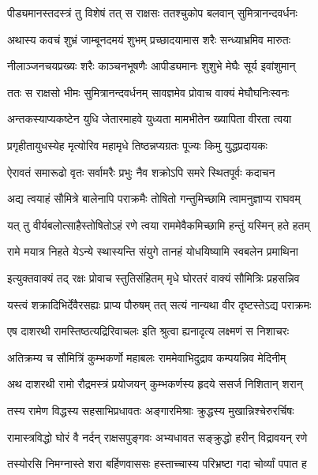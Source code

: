\twolineshloka
{पीड्यमानस्तदस्त्रं तु विशेषं तत् स राक्षसः}
{ततश्चुकोप बलवान् सुमित्रानन्दवर्धनः} %

\twolineshloka
{अथास्य कवचं शुभ्रं जाम्बूनदमयं शुभम्}
{प्रच्छादयामास शरैः सन्ध्याभ्रमिव मारुतः} %

\twolineshloka
{नीलाञ्जनचयप्रख्यः शरैः काञ्चनभूषणैः}
{आपीड्यमानः शुशुभे मेघैः सूर्य इवांशुमान्} %

\twolineshloka
{ततः स राक्षसो भीमः सुमित्रानन्दवर्धनम्}
{सावज्ञमेव प्रोवाच वाक्यं मेघौघनिःस्वनः} %

\twolineshloka
{अन्तकस्याप्यकष्टेन युधि जेतारमाहवे}
{युध्यता मामभीतेन ख्यापिता वीरता त्वया} %

\twolineshloka
{प्रगृहीतायुधस्येह मृत्योरिव महामृधे}
{तिष्ठन्नप्यग्रतः पूज्यः किमु युद्धप्रदायकः} %

\twolineshloka
{ऐरावतं समारूढो वृतः सर्वामरैः प्रभुः}
{नैव शक्रोऽपि समरे स्थितपूर्वः कदाचन} %

\twolineshloka
{अद्य त्वयाहं सौमित्रे बालेनापि पराक्रमैः}
{तोषितो गन्तुमिच्छामि त्वामनुज्ञाप्य राघवम्} %

\twolineshloka
{यत् तु वीर्यबलोत्साहैस्तोषितोऽहं रणे त्वया}
{राममेवैकमिच्छामि हन्तुं यस्मिन् हते हतम्} %

\twolineshloka
{रामे मयात्र निहते येऽन्ये स्थास्यन्ति संयुगे}
{तानहं योधयिष्यामि स्वबलेन प्रमाथिना} %

\twolineshloka
{इत्युक्तवाक्यं तद् रक्षः प्रोवाच स्तुतिसंहितम्}
{मृधे घोरतरं वाक्यं सौमित्रिः प्रहसन्निव} %

\twolineshloka
{यस्त्वं शक्रादिभिर्देवैरसह्यः प्राप्य पौरुषम्}
{तत् सत्यं नान्यथा वीर दृष्टस्तेऽद्य पराक्रमः} %

\twolineshloka
{एष दाशरथी रामस्तिष्ठत्यद्रिरिवाचलः}
{इति श्रुत्वा ह्यनादृत्य लक्ष्मणं स निशाचरः} %

\twolineshloka
{अतिक्रम्य च सौमित्रिं कुम्भकर्णो महाबलः}
{राममेवाभिदुद्राव कम्पयन्निव मेदिनीम्} %

\twolineshloka
{अथ दाशरथी रामो रौद्रमस्त्रं प्रयोजयन्}
{कुम्भकर्णस्य हृदये ससर्ज निशितान् शरान्} %

\twolineshloka
{तस्य रामेण विद्धस्य सहसाभिप्रधावतः}
{अङ्गारमिश्राः क्रुद्धस्य मुखान्निश्चेरुरर्चिषः} %

\twolineshloka
{रामास्त्रविद्धो घोरं वै नर्दन् राक्षसपुङ्गवः}
{अभ्यधावत सङ्क्रुद्धो हरीन् विद्रावयन् रणे} %

\twolineshloka
{तस्योरसि निमग्नास्ते शरा बर्हिणवाससः}
{हस्ताच्चास्य परिभ्रष्टा गदा चोर्व्यां पपात ह} %

